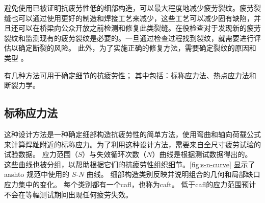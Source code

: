 避免使用已被证明抗疲劳性低的细部构造，可以最大程度地减少疲劳裂纹。疲劳裂缝也可以通过使用更好的制造和焊接工艺来减少，这些工艺可以减少固有缺陷，并且还可以在桥梁向公众开放之前检测和修复此类裂缝。在役检查对于发现新的疲劳裂纹和监测现有的疲劳裂纹是必要的。一旦通过检查过程找到裂纹，就需要进行评估以确定断裂的风险。 此外，为了实施正确的修复方法，需要确定裂纹的原因和类型 \cite{fisher1998f}。

有几种方法可用于确定细节的抗疲劳性； 其中包括：标称应力法、热点应力法和断裂力学。

\subsection{标称应力法}
这种设计方法是一种确定细部构造抗疲劳性的简单方法，使用弯曲和轴向荷载公式来计算焊趾附近的标称应力。为了利用这种设计方法，需要来自全尺寸疲劳试验的试验数据。 应力范围（$S$）与失效循环次数（$N$）曲线是根据测试数据得出的。 这些曲线也被分组，以帮助根据它们的抗疲劳性组织细节。\cref{fig:s-n-curve} 显示了 \gls*{aashto} 规范中使用的 $S$-$N$ 曲线。 细部构造类别反映并说明组合的几何和局部缺口应力集中的变化。 每个类别都有一个\acrfull{cafl}，也称为\acrfull{caft}。 低于\acrlong*{cafl}的应力范围预计不会在等幅测试期间出现任何疲劳失效。

